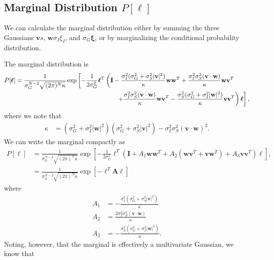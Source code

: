 \documentclass[11pt]{article}
\begin{document}
	\subsection{Marginal Distribution $P[\boldsymbol{\ell}]$}
	We can calculate the marginal distribution either by summing the three Gaussians $\mathbf{v}s$, $\mathbf{w} \sigma_I \xi_I$, and $\sigma_G\boldsymbol{\xi}$, or by marginalizing the conditional probability distribution. 
	
	The marginal distribution is 
	\begin{align}
		 P[\boldsymbol{\ell}] = \frac{1}{\sigma_G^{N-2} \sqrt{(2\pi)^N \kappa}} &\exp\left[-\frac{1}{2\sigma_G^2} \boldsymbol{\ell}^T  \left(\mathbf{I} -\frac{\sigma_I^2 (\sigma_G^2 + \sigma_S^2 |\mathbf{v}|^2)}{\kappa} \mathbf{ww}^T + \frac{\sigma_I^2 \sigma_S^2 (\mathbf{v}\cdot\mathbf{w})}{\kappa}\mathbf{wv}^T \right. \right. \notag \\
		&\left. \left. \qquad \qquad \qquad \qquad  + \frac{\sigma_I^2 \sigma_S^2 (\mathbf{v}\cdot\mathbf{w})}{\kappa}\mathbf{wv}^T- \frac{\sigma_S^2 (\sigma_G^2 +\sigma_I^2 |\mathbf{w}|^2)}{\kappa} \mathbf{vv}^T\right) \boldsymbol{\ell}\right], \label{marginal-1}
	\end{align}
	where we note that 
	\begin{align}
		\kappa &= (\sigma_G^2 + \sigma_I^2 |\mathbf{w}|^2)(\sigma_G^2 + \sigma_S^2 |\mathbf{v}|^2) - \sigma_I^2 \sigma_S^2 (\mathbf{v}\cdot\mathbf{w})^2.
	\end{align}
	We can write the marginal compactly as 
	\begin{align}
		P[\boldsymbol{\ell}] &= \frac{1}{\sigma_G^{N-2} \sqrt{(2\pi)^N \kappa}} \exp\left[-\frac{1}{2\sigma_G^2} \boldsymbol{\ell}^T \left(\mathbf{I} + A_1 \mathbf{ww}^T + A_2 (\mathbf{wv}^T +\mathbf{vw}^T) + A_3 \mathbf{vv}^T\right) \boldsymbol{\ell}\right], \label{marginal-2}\\
		&= \frac{1}{\sigma_G^{N-2} \sqrt{(2\pi)^N \kappa}} \exp\left[-\boldsymbol{\ell}^T \mathbf{A} \boldsymbol{\ell}\right]
	\end{align}
	where
	\begin{align}
		A_1 &= -\frac{\sigma_I^2 (\sigma_G^2 + \sigma_S^2 |\mathbf{v}|^2)}{\kappa} \\
		A_2 &= \frac{2 \sigma_I^2 \sigma_S^2 (\mathbf{v}\cdot\mathbf{w})}{\kappa} \\
		A_3 &= -\frac{\sigma_S^2 (\sigma_G^2 + \sigma_I^2 |\mathbf{w}|^2)}{\kappa}.
	\end{align}
	Noting, however, that the marginal is effectively a multivariate Gaussian, we know that
\end{document}
